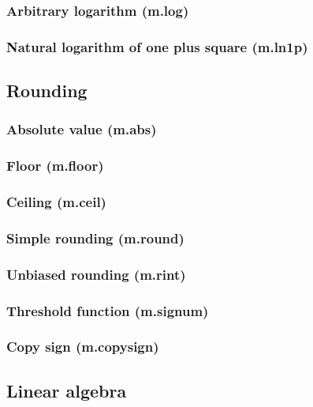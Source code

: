 \documentclass{article}
\theoremstyle{definition}
\begin{document}
\subsubsection{Arbitrary logarithm (m.log)}

\subsubsection{Natural logarithm of one plus square (m.ln1p)}

\subsection{Rounding}

\subsubsection{Absolute value (m.abs)}

\subsubsection{Floor (m.floor)}

\subsubsection{Ceiling (m.ceil)}

\subsubsection{Simple rounding (m.round)}

\subsubsection{Unbiased rounding (m.rint)}

\subsubsection{Threshold function (m.signum)}

\subsubsection{Copy sign (m.copysign)}

\subsection{Linear algebra}
\end{document}
